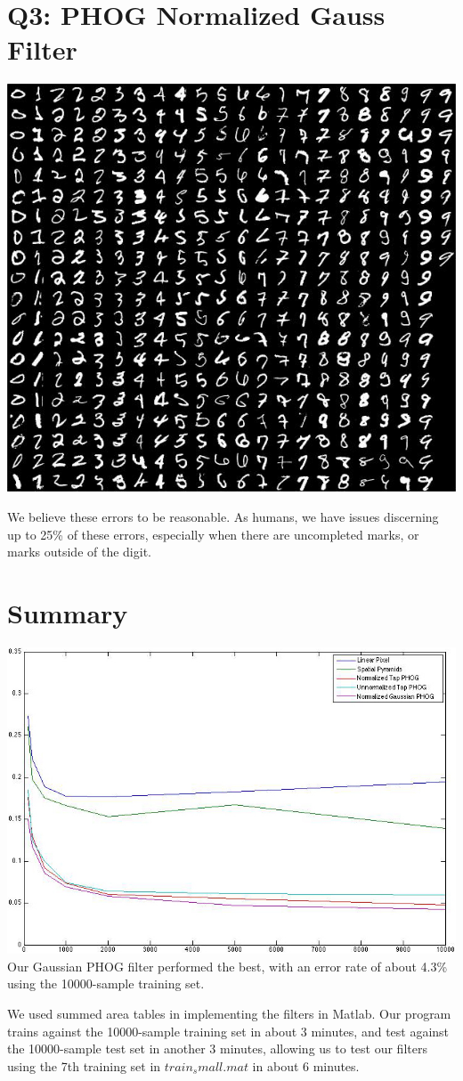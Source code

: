 \documentclass[12pt]{article}
\begin{document}
\section*{Q3: PHOG Normalized Gauss Filter}
  \begin{center}
  \includegraphics[scale=0.75]{q4_phog_normalized_err.jpg}
  \end{center}
  We believe these errors to be reasonable. 
  As humans, we have issues discerning up to 25\% of these errors, especially
  when there are uncompleted marks, or marks outside of the digit.

\newpage
\section*{Summary}
  \includegraphics[scale=0.7]{allgraphs_sm.jpg}
  Our Gaussian PHOG filter performed the best, with an error rate of about 4.3\%
   using the 10000-sample training set.

  We used summed area tables in implementing the filters in Matlab. Our program
  trains against the 10000-sample training set in about 3 minutes, and test 
  against the 10000-sample test set in another 3 minutes, allowing us to test 
  our filters using the 7th training set in $train_small.mat$ in about 6 minutes.
\end{document}
